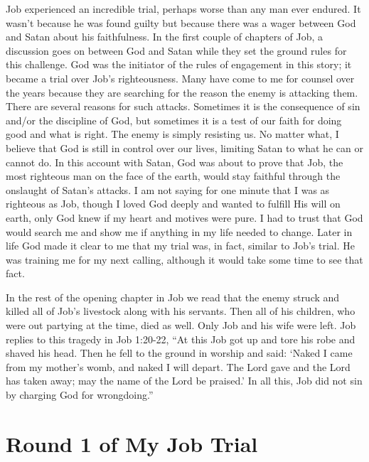 \documentclass[oneside]{book}
\begin{document}
Job experienced an incredible trial, perhaps worse than any man ever endured. It wasn’t because he was found guilty but because there was a wager between God and Satan about his faithfulness. In the first couple of chapters of Job, a discussion goes on between God and Satan while they set the ground rules for this challenge. God was the initiator of the rules of engagement in this story; it became a trial over Job’s righteousness. Many have come to me for counsel over the years because they are searching for the reason the enemy is attacking them. There are several reasons for such attacks. Sometimes it is the consequence of sin and/or the discipline of God, but sometimes it is a test of our faith for doing good and what is right. The enemy is simply resisting us. No matter what, I believe that God is still in control over our lives, limiting Satan to what he can or cannot do. In this account with Satan, God was about to prove that Job, the most righteous man on the face of the earth, would stay faithful through the onslaught of Satan's attacks. I am not saying for one minute that I was as righteous as Job, though I loved God deeply and wanted to fulfill His will on earth, only God knew if my heart and motives were pure. I had to trust that God would search me and show me if anything in my life needed to change. Later in life God made it clear to me that my trial was, in fact, similar to Job's trial. He was training me for my next calling, although it would take some time to see that fact.

In the rest of the opening chapter in Job we read that the enemy struck and killed all of Job's livestock along with his servants. Then all of his children, who were out partying at the time, died as well. Only Job and his wife were left. Job replies to this tragedy in Job 1:20-22, “At this Job got up and tore his robe and shaved his head. Then he fell to the ground in worship and said: ‘Naked I came from my mother's womb, and naked I will depart. The Lord gave and the Lord has taken away; may the name of the Lord be praised.’ In all this, Job did not sin by charging God for wrongdoing.”


\section{Round 1 of My Job Trial}
\
\end{document}
